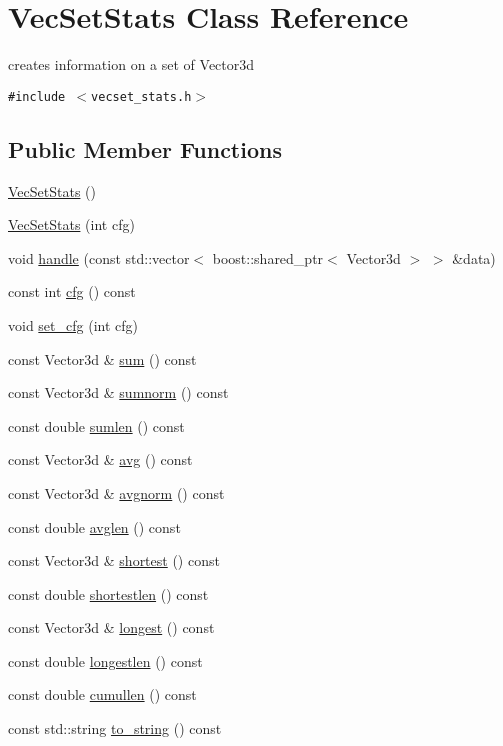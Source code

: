 \hypertarget{class_vec_set_stats}{
\section{VecSetStats Class Reference}
\label{class_vec_set_stats}
}
creates information on a set of Vector3d  


{\tt \#include $<$vecset\_\-stats.h$>$}

\subsection*{Public Member Functions}
\begin{CompactItemize}
\item 
\hyperlink{class_vec_set_stats_c4f1f328da6ba34452e433c6d28b313a}{VecSetStats} ()
\item 
\hyperlink{class_vec_set_stats_15b02682930db0edc827dfcdcfbfcf69}{VecSetStats} (int cfg)
\item 
void \hyperlink{class_vec_set_stats_cf9ea6b5b6b3880f6a55f68c3546b859}{handle} (const std::vector$<$ boost::shared\_\-ptr$<$ Vector3d $>$ $>$ \&data)
\item 
const int \hyperlink{class_vec_set_stats_8d51d3b79744c15c0fa669abbad1d469}{cfg} () const 
\item 
void \hyperlink{class_vec_set_stats_41912c77a81f3fbaeaf15dbdcdb4b4b8}{set\_\-cfg} (int cfg)
\item 
const Vector3d \& \hyperlink{class_vec_set_stats_dddc218d55693faa61892774a28b1929}{sum} () const 
\item 
const Vector3d \& \hyperlink{class_vec_set_stats_cb1197a75e96a53182cc0904312240b3}{sumnorm} () const 
\item 
const double \hyperlink{class_vec_set_stats_c3cb153b88e051899d7d731181bef46c}{sumlen} () const 
\item 
const Vector3d \& \hyperlink{class_vec_set_stats_9b87664854b8b4eaf4d4a9b7ce6dd9dd}{avg} () const 
\item 
const Vector3d \& \hyperlink{class_vec_set_stats_7a17760a90c4ae82919f7976df427ba2}{avgnorm} () const 
\item 
const double \hyperlink{class_vec_set_stats_823c982b6d964b040bcd0afe5623ae5a}{avglen} () const 
\item 
const Vector3d \& \hyperlink{class_vec_set_stats_6fb6a02bbdabbcfb815cdb591c850030}{shortest} () const 
\item 
const double \hyperlink{class_vec_set_stats_b91c568dbcd9cd91a16f2610af2b66aa}{shortestlen} () const 
\item 
const Vector3d \& \hyperlink{class_vec_set_stats_c5e5192e85e5633cdedf4900f46adb1d}{longest} () const 
\item 
const double \hyperlink{class_vec_set_stats_746c64887edd603e6bf6d139078f8a5c}{longestlen} () const 
\item 
const double \hyperlink{class_vec_set_stats_bada15ff01d5ab8b4a5addae68cd8b02}{cumullen} () const 
\item 
const std::string \hyperlink{class_vec_set_stats_1618681fee0ab61e61243be352a4cee5}{to\_\-string} () const 
\end{CompactItemize}
